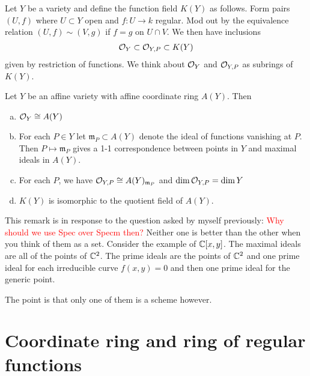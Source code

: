 \documentclass[12pt]{article}
\begin{document}

\begin{definition}
Let $Y$ be a variety and define the function field $K(Y)$ as follows. Form pairs $(U,f)$ where $U\subset Y$ open and $f:U\to k$ regular. Mod out by the equivalence relation $(U,f) \sim (V,g)$ if $f = g$ on $U\cap V$. We then have inclusions \begin{align*}
    \mathcal{O}_Y \subset \mathcal{O}_{Y,P} \subset K(Y)
\end{align*} given by restriction of functions. We think about $\mathcal{O}_Y$ and $\mathcal{O}_{Y,P}$ as subrings of $K(Y)$.
\end{definition}

\begin{theorem}
Let $Y$ be an affine variety with affine coordinate ring $A(Y)$. Then \begin{enumerate}[(a)]
    \item $\mathcal{O}_Y \cong A(Y)$
    \item For each $P\in Y$ let $\mathfrak{m}_P\subset A(Y)$ denote the ideal of functions vanishing at $P$. Then $P\mapsto \mathfrak{m}_P$ gives a 1-1 correspondence between points in $Y$ and maximal ideals in $A(Y)$. 
    \item For each $P$, we have $\mathcal{O}_{Y,P}\cong A(Y)_{\mathfrak{m}_P}$ and $\dim \mathcal{O}_{Y,P} = \dim Y$
    \item $K(Y)$ is isomorphic to the quotient field of $A(Y)$.
\end{enumerate}     
\end{theorem}

\begin{remark}
This remark is in response to the question asked by myself previously: \textcolor{red}{Why should we use Spec over Specm then?} Neither one is better than the other when you think of them as a set. Consider the example of $\mathbb{C}[x,y]$. The maximal ideals are all of the points of $\mathbb{C}^2$. The prime ideals are the points of $\mathbb{C}^2$ and one prime ideal for each irreducible curve $f(x,y) = 0$ and then one prime ideal for the generic point.

\hfill

The point is that only one of them is a scheme however. 
\end{remark}

\section{Coordinate ring and ring of regular functions}
\end{document}
